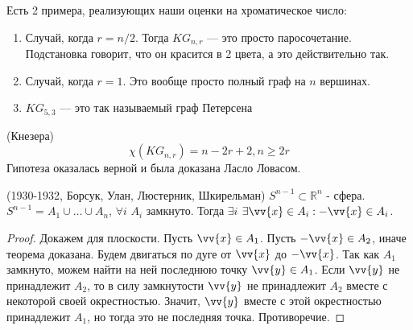 \begin{example}
	Есть 2 примера, реализующих наши оценки на хроматическое число:
	\begin{enumerate}
		\item Случай, когда $r = n / 2$. Тогда $KG_{n, r}$ --- это просто паросочетание. Подстановка говорит, что он красится в 2 цвета, а это действительно так.
		
		\item Случай, когда $r = 1$. Это вообще просто полный граф на $n$ вершинах.
		
		\item $KG_{5, 3}$ --- это так называемый граф Петерсена
	\end{enumerate}
\end{example}

\begin{hypothesis}(Кнезера)
\[
\chi(KG_{n,r}) = n - 2r + 2, n \ge 2r
\]
Гипотеза оказалась верной и была доказана Ласло Ловасом.
\end{hypothesis}

\begin{theorem}(1930-1932, Борсук, Улан, Люстерник, Шкирельман)
$S^{n-1} \subset \mathbb{R}^n$ - сфера. $S^{n-1} = A_1 \cup \dots \cup A_n$, $\forall i$ $A_i$ замкнуто. Тогда $\exists i$ $\exists \vv{x} \in A_i: -\vv{x} \in A_i$.

\end{theorem}

\begin{proof}
Докажем для плоскости. Пусть $\vv{x} \in A_1$. Пусть $-\vv{x} \in A_2$, иначе теорема доказана. Будем двигаться по дуге от $\vv{x}$ до $- \vv{x}$. Так как $A_1$ замкнуто, можем найти на ней последнюю точку $\vv{y} \in A_1$. Если $\vv{y}$ не принадлежит $A_2$, то в силу замкнутости $\vv{y}$ не принадлежит $A_2$ вместе с некоторой своей окрестностью. Значит, $\vv{y}$  вместе с этой окрестностью принадлежит $A_1$, но тогда это не последняя точка. Противоречие.
\end{proof}


